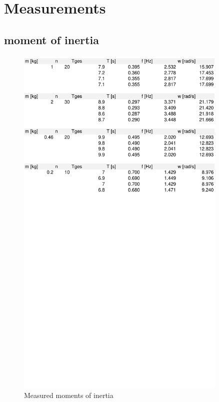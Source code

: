 \documentclass{scrreprt}
\begin{document}
\section{Measurements}
\subsection{moment of inertia}
\begin{figure}[H]
	\centering
  \includegraphics[width=0.9\textwidth]{diag/inertia.pdf}
	\caption{Measured moments of inertia}
	\label{fig:inertia}
\end{figure}
\end{document}
